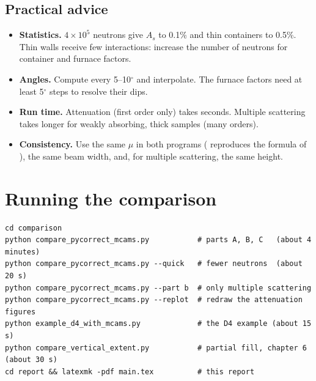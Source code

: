 \documentclass[11pt,a4paper]{report}
\begin{document}
\section{Practical advice}

\begin{itemize}
  \item \textbf{Statistics.} $4\times10^5$ neutrons give $A_s$ to 0.1\% and thin
        containers to 0.5\%. Thin walls receive few interactions: increase the
        number of neutrons for container and furnace factors.
  \item \textbf{Angles.} Compute every 5--10$^\circ$ and interpolate. The furnace
        factors need at least 5$^\circ$ steps to resolve their dips.
  \item \textbf{Run time.} Attenuation (first order only) takes seconds.
        Multiple scattering takes longer for weakly absorbing, thick samples
        (many orders).
  \item \textbf{Consistency.} Use the same $\mu$ in both programs
        ( reproduces the formula of \pyc), the same beam
        width, and, for multiple scattering, the same height.
\end{itemize}

\chapter{Running the comparison}

\begin{lstlisting}[style=shell]
cd comparison
python compare_pycorrect_mcams.py           # parts A, B, C   (about 4 minutes)
python compare_pycorrect_mcams.py --quick   # fewer neutrons  (about 20 s)
python compare_pycorrect_mcams.py --part b  # only multiple scattering
python compare_pycorrect_mcams.py --replot  # redraw the attenuation figures
python example_d4_with_mcams.py             # the D4 example (about 15 s)
python compare_vertical_extent.py           # partial fill, chapter 6 (about 30 s)
cd report && latexmk -pdf main.tex          # this report
\end{lstlisting}
\end{document}

